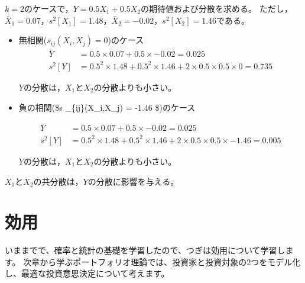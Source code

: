 \documentclass[
  letterpaper,
  pandoc,
  ja=standard,
  jafont = hiragino-pron]{ltjsbook}
\begin{document}
\begin{tcolorbox}[enhanced jigsaw, colframe=quarto-callout-warning-color-frame, breakable, rightrule=.15mm, coltitle=black, title=\textcolor{quarto-callout-warning-color}{\faExclamationTriangle}\hspace{0.5em}{例2}, colbacktitle=quarto-callout-warning-color!10!white, leftrule=.75mm, colback=white, left=2mm, arc=.35mm, opacityback=0, titlerule=0mm, toptitle=1mm, bottomtitle=1mm, bottomrule=.15mm, toprule=.15mm, opacitybacktitle=0.6]

\(k=2\)のケースで，\(Y=0.5X_1 + 0.5 X_2\)の期待値および分散を求める。
ただし，\(\bar X_1 = 0.07\)，\(s^2[X_1] = 1.48\)，\(\bar X _2 = -0.02\)，\(s^2 [X_2] = 1.46\)である。

\begin{itemize}
\item
  無相関(\(s _{ij} (X_i,X_j) = 0\))のケース \[
    \begin{aligned}
    \bar Y   &= 0.5 \times 0.07 + 0.5 \times - 0.02 = 0.025\\
    s^2 [Y]  &= 0.5^2 \times 1.48 + 0.5^2 \times 1.46 + 2 \times 0.5 \times 0.5 \times 0 = 0.735
    \end{aligned}
    \]

  \(Y\)の分散は，\(X_1\)と\(X_2\)の分散よりも小さい。
\item
  負の相関(\$s \_\{ij\}(X\_i,X\_j) = -1.46 \$)のケース

  \[
    \begin{aligned}
    \bar Y   &= 0.5 \times 0.07 + 0.5 \times - 0.02 = 0.025\\
    s^2 [Y]  &= 0.5^2 \times 1.48 + 0.5^2 \times 1.46 + 2 \times 0.5 \times 0.5 \times -1.46 = 0.005
    \end{aligned}
    \]

  \(Y\)の分散は，\(X_1\)と\(X_2\)の分散よりも小さい。
\end{itemize}

\(X_1\)と\(X_2\)の共分散は，\(Y\)の分散に影響を与える。

\end{tcolorbox}


\chapter{効用}\label{ux52b9ux7528}

いままでで、確率と統計の基礎を学習したので、つぎは効用について学習します。
次章から学ぶポートフォリオ理論では、投資家と投資対象の2つをモデル化し、最適な投資意思決定について考えます。
\end{document}
